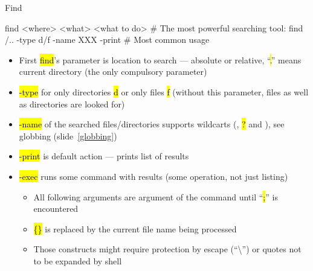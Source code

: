 \documentclass[compress, ucs, xelatex, 11pt, xcolor=svgnames,
  hyperref={
    bookmarks=true,
    unicode=true,
    colorlinks=true,
    pdftitle={Linux, command line and MetaCentrum},
    plainpages=false,
    pdfauthor={Vojtech Zeisek},
    pdfsubject={Course about use of Linux command line, writing shell scripts and using MetaCentrum of CESNET},
    pdfcreator={XeLaTeX},
    pdfkeywords={Linux, GNU, BASH, shell, command line, MetaCentrum},
    linkcolor=DarkRed,
    anchorcolor=DarkBlue,
    citecolor=Indigo,
    filecolor=NavyBlue,
    menucolor=DarkMagenta,
    urlcolor=DarkBlue,
    pdftex},
  url={hyphens, lowtilde} %
  ]{beamer}
\renewcommand{\texttt}[1]{\hl{\ttfamily #1}}
\begin{document}
\begin{frame}[fragile]{Find}
  \begin{bashcode}
    find <where> <what> <what to do> # The most powerful searching tool:
    find /.. -type d/f -name XXX -print # Most common usage
  \end{bashcode}
  \begin{itemize}
    \item First \texttt{find}'s parameter is location to search --- absolute or relative, ``\texttt{.}'' means current directory (the only compulsory parameter)
    \item \texttt{-type} for only directories \texttt{d} or only files \texttt{f} (without this parameter, files as well as directories are looked for)
    \item \texttt{-name} of the searched files/directories supports wildcarts (\texttt{*}, \texttt{?} and \texttt{[\ldots]}), see globbing (slide~\ref{globbing})
    \item \texttt{-print} is default action --- prints list of results
    \item \texttt{-exec} runs some command with results (some operation, not just listing)
    \begin{itemize}
      \item All following arguments are argument of the command until ``\texttt{;}'' is encountered
      \item \texttt{\{\}} is replaced by the current file name being processed
      \item Those constructs might require protection by escape (``\textbackslash'') or quotes not to be expanded by shell
    \end{itemize}
  \end{itemize}
\end{frame}
\end{document}
